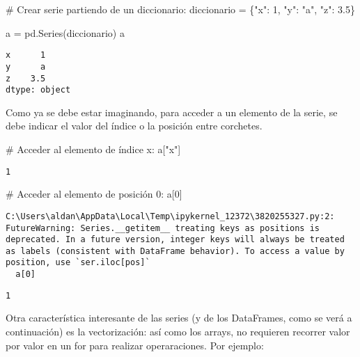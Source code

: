 \documentclass[
  letterpaper,
  DIV=11,
  numbers=noendperiod]{scrreprt}
\newenvironment{Shaded}{\begin{snugshade}}{\end{snugshade}}
\newcommand{\CommentTok}[1]{\textcolor[rgb]{0.37,0.37,0.37}{#1}}
\newcommand{\DecValTok}[1]{\textcolor[rgb]{0.68,0.00,0.00}{#1}}
\newcommand{\FloatTok}[1]{\textcolor[rgb]{0.68,0.00,0.00}{#1}}
\newcommand{\NormalTok}[1]{\textcolor[rgb]{0.00,0.23,0.31}{#1}}
\newcommand{\OperatorTok}[1]{\textcolor[rgb]{0.37,0.37,0.37}{#1}}
\newcommand{\StringTok}[1]{\textcolor[rgb]{0.13,0.47,0.30}{#1}}
\begin{document}
\begin{Shaded}
\begin{Highlighting}[]
\CommentTok{\# Crear serie partiendo de un diccionario:}
\NormalTok{diccionario }\OperatorTok{=}\NormalTok{ \{}\StringTok{"x"}\NormalTok{: }\DecValTok{1}\NormalTok{, }\StringTok{"y"}\NormalTok{: }\StringTok{"a"}\NormalTok{, }\StringTok{"z"}\NormalTok{: }\FloatTok{3.5}\NormalTok{\}}

\NormalTok{a }\OperatorTok{=}\NormalTok{ pd.Series(diccionario)}
\NormalTok{a}
\end{Highlighting}
\end{Shaded}

\begin{verbatim}
x      1
y      a
z    3.5
dtype: object
\end{verbatim}

Como ya se debe estar imaginando, para acceder a un elemento de la
serie, se debe indicar el valor del índice o la posición entre
corchetes.

\begin{Shaded}
\begin{Highlighting}[]
\CommentTok{\# Acceder al elemento de índice x:}
\NormalTok{a[}\StringTok{"x"}\NormalTok{]}
\end{Highlighting}
\end{Shaded}

\begin{verbatim}
1
\end{verbatim}

\begin{Shaded}
\begin{Highlighting}[]
\CommentTok{\# Acceder al elemento de posición 0:}
\NormalTok{a[}\DecValTok{0}\NormalTok{]}
\end{Highlighting}
\end{Shaded}

\begin{verbatim}
C:\Users\aldan\AppData\Local\Temp\ipykernel_12372\3820255327.py:2: FutureWarning: Series.__getitem__ treating keys as positions is deprecated. In a future version, integer keys will always be treated as labels (consistent with DataFrame behavior). To access a value by position, use `ser.iloc[pos]`
  a[0]
\end{verbatim}

\begin{verbatim}
1
\end{verbatim}

Otra característica interesante de las series (y de los DataFrames, como
se verá a continuación) es la vectorización: así como los arrays, no
requieren recorrer valor por valor en un for para realizar
operaraciones. Por ejemplo:
\end{document}
